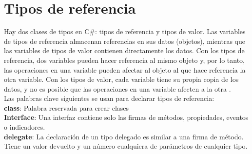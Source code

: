 \documentclass[12pt,a4paper]{report}
\begin{document}
\section{Tipos de referencia}
Hay dos clases de tipos en C\#: tipos de referencia y tipos de valor. Las variables de tipos de referencia almacenan referencias en sus datos (objetos), mientras que las variables de tipos de valor contienen directamente los datos. Con los tipos de referencia, dos variables pueden hacer referencia al mismo objeto y, por lo tanto, las operaciones en una variable pueden afectar al objeto al que hace referencia la otra variable. Con los tipos de valor, cada variable tiene su propia copia de los datos, y no es posible que las operaciones en una variable afecten a la otra .\\Las palabras clave siguientes se usan para declarar tipos de referencia:\\\textbf{class}: Palabra reservada para crear clases\\\textbf{Interface}: Una interfaz contiene solo las firmas de métodos, propiedades, eventos o indicadores.\\\textbf{delegate}: La declaración de un tipo delegado es similar a una firma de método. Tiene un valor devuelto y un número cualquiera de parámetros de cualquier tipo.
\end{document}
